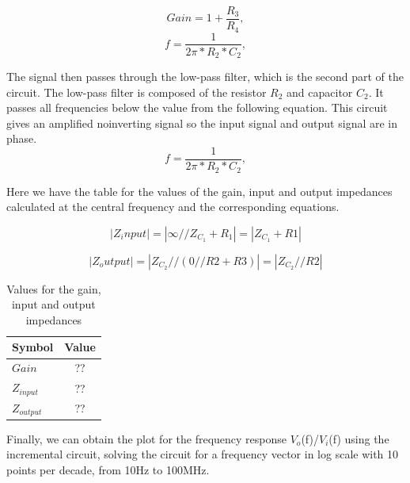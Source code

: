 \begin{equation}
  Gain = 1+ \frac{R_3}{R_4},
  \label{eq:gain}
\end{equation}
\begin{equation}
  {f} = \frac{1}{2\pi*R_2*C_2},
  \label{eq:f1}
\end{equation}

The signal then passes through the low-pass filter, which is the second part of the circuit. The low-pass filter is composed of the resistor $R_2$ and capacitor $C_2$. It passes all frequencies below the value from the following equation. This circuit gives an amplified noinverting signal so the input signal and output signal are in phase.
\begin{equation}
  {f} = \frac{1}{2\pi*R_2*C_2},
  \label{eq:f2}
\end{equation}



Here we have the table for the values of the gain, input and output impedances calculated at the central frequency and the corresponding equations. 


\begin{equation}
|Z_input| = |\infty // Z_{C_1} + R_1| = |Z_{C_1} + R1|
\label{eq:impendances1}
\end{equation}

\begin{equation}
|Z_output| = |Z_{C_2} // (0 // R2 + R3)| = |Z_{C_2} // R2|
\label{eq:impendances2}
\end{equation}

\begin{table}[h]
    \centering
    \begin{tabular}{|l|c|}
    \hline
    {\bf Symbol} & {\bf Value} \\ \hline
    $Gain$ & ?? \\ \hline
    $Z_{input}$ & ?? \\ \hline
    $Z_{output}$ & ??  \\ \hline

    \end{tabular}
    \caption{Values for the gain, input and output impedances}
    \label{tab:valuesimp}
\end{table}

Finally, we can obtain the plot for the frequency response $V_o$(f)/$V_i$(f) using the incremental circuit, solving the circuit for a frequency vector in log scale with 10 points per decade, from 10Hz to 100MHz.



  





